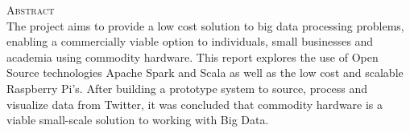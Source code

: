 \documentclass[12pt]{article} %
\begin{document}
				\begin{figure}[H] %
					\label{fig:speciation}
				\end{figure}
		
		\newpage
		
		\begin{flushleft}\large
			\textsc{Abstract}\\
			The project aims to provide a low cost solution to big data processing problems, enabling a commercially viable option to individuals, small businesses and academia using commodity hardware. This report explores the use of  Open Source technologies Apache Spark and Scala as well as the low cost and scalable Raspberry Pi's. After building a prototype system to source, process and visualize data from Twitter, it was concluded that  commodity hardware is a viable small-scale solution to working with Big Data.
			
		\end{flushleft}
	
\end{document}
